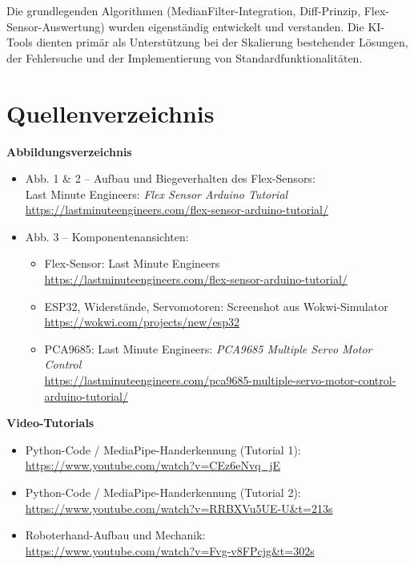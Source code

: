 \documentclass[12pt,a4paper]{article}
\begin{document}
Die grundlegenden Algorithmen (MedianFilter-Integration, Diff-Prinzip, 
Flex-Sensor-Auswertung) wurden eigenständig entwickelt und verstanden. Die KI-Tools 
dienten primär als Unterstützung bei der Skalierung bestehender Lösungen, der 
Fehlersuche und der Implementierung von Standardfunktionalitäten.
\newpage

\section{Quellenverzeichnis}

\textbf{Abbildungsverzeichnis}
\begin{itemize}[itemsep=4pt]
    \item Abb. 1 \& 2 -- Aufbau und Biegeverhalten des Flex-Sensors: \\
    Last Minute Engineers: \textit{Flex Sensor Arduino Tutorial} \\
    \url{https://lastminuteengineers.com/flex-sensor-arduino-tutorial/}

    \item Abb. 3 -- Komponentenansichten:
    \begin{itemize}[itemsep=2pt]
        \item Flex-Sensor: Last Minute Engineers \\
        \url{https://lastminuteengineers.com/flex-sensor-arduino-tutorial/}
        \item ESP32, Widerstände, Servomotoren: Screenshot aus Wokwi-Simulator \\
        \url{https://wokwi.com/projects/new/esp32}
        \item PCA9685: Last Minute Engineers: \textit{PCA9685 Multiple Servo Motor Control} \\
        \url{https://lastminuteengineers.com/pca9685-multiple-servo-motor-control-arduino-tutorial/}
    \end{itemize}
\end{itemize}

\vspace{0.5em}
\textbf{Video-Tutorials}
\begin{itemize}[itemsep=4pt]
    \item Python-Code / MediaPipe-Handerkennung (Tutorial 1): \\
    \url{https://www.youtube.com/watch?v=CEz6eNvq_jE}
    \item Python-Code / MediaPipe-Handerkennung (Tutorial 2): \\
    \url{https://www.youtube.com/watch?v=RRBXVu5UE-U&t=213s}
    \item Roboterhand-Aufbau und Mechanik: \\
    \url{https://www.youtube.com/watch?v=Fvg-v8FPcjg&t=302s}
\end{itemize}
\end{document}
